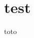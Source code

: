 \documentclass{beamer}
\begin{document}
\begin{frame}
\tableofcontents
\end{frame}

\section{test}
\begin{frame}
toto
\end{frame}
\end{document}
